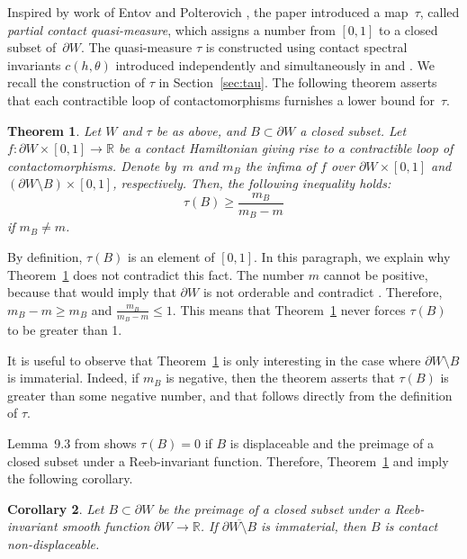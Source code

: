 \documentclass[pdftex]{sigma}
\numberwithin{equation}{section}
\newtheorem{Theorem}{Theorem}
\newtheorem{Corollary}[Theorem]{Corollary}
\theoremstyle{definition}
\begin{document}
Inspired by work of Entov and Polterovich \cite{Ent14, EP06,EP08,EP-rigidity}, the paper \cite{djordjevic2025quantitative} introduced {a map~$\tau$, called \emph{partial contact quasi-measure},} which assigns a number from $[0,1]$ to a closed subset of~$\partial W$. The quasi-measure $\tau$ is constructed using contact spectral invariants $c(h, \theta)$ introduced independently and simultaneously in \cite{cant2023shelukhin} and \cite{djordjevic2023quantitative}. We recall the construction of $\tau$ in Section~\ref{sec:tau}. The following theorem asserts that each contractible loop of contactomorphisms furnishes a lower bound for~$\tau$.

\begin{Theorem}\label{thm:tau}
Let $W$ and $\tau$ be as above, and $B\subset \partial W$ a closed subset. Let $f\colon\partial W\times [0,1]\to\mathbb{R}$ be a contact Hamiltonian giving rise to a contractible loop of contactomorphisms. Denote {by}~$m$ and $m_B$ the infima of $f$ over $\partial W\times[0,1]$ and $(\partial W\setminus B)\times[0,1]$, respectively. Then, the following inequality holds:
\[\tau(B)\geqslant \frac{m_B}{m_B-m}\]
if $m_B\not=m$.
\end{Theorem}

{By definition, $\tau(B)$ is an element of $[0,1]$. In this paragraph, we explain why Theorem~\ref{thm:tau} does not contradict this fact. The number $m$ cannot be positive, because that would imply that $\partial W$ is not orderable and contradict \cite[Theorem~1.6]{djordjevic2025quantitative}. Therefore, $m_B-m\geqslant m_B$ and $\frac{m_B}{m_B-m}\leqslant 1$. This means that Theorem~\ref{thm:tau} never forces $\tau(B)$ to be greater than 1.

It is useful to observe that Theorem~\ref{thm:tau} is only interesting in the case where $\partial W\setminus B$ is immaterial. Indeed, if $m_B$ is negative, then the theorem asserts that $\tau(B)$ is greater than some negative number, and that follows directly from the definition of $\tau$.}
Lemma~9.3 from \cite{djordjevic2025quantitative} shows $\tau(B)=0$ if $B$ is displaceable and the preimage of a closed subset under a Reeb-invariant function. Therefore, Theorem~\ref{thm:tau} and \cite[Lemma~9.3]{djordjevic2025quantitative} imply the following corollary.


\begin{Corollary}\label{cor:nondisp}
Let $B\subset\partial W$ be the preimage of a closed subset under a Reeb-invariant smooth function {$\partial W\to\mathbb{R}$}. If $\overline{\partial W \setminus B}$ is immaterial, then $B$ is contact non-displaceable.
\end{Corollary}
\end{document}

